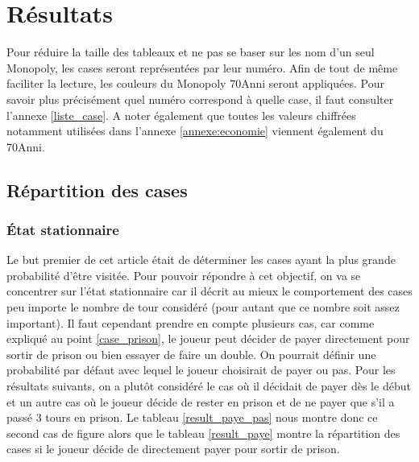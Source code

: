 \documentclass[letterpaper]{article}
\begin{document}
\section{Résultats}
  Pour réduire la taille des tableaux et ne pas se baser sur les nom d'un seul
  Monopoly, les cases seront représentées par leur numéro.  Afin de tout de même
  faciliter la lecture, les couleurs du Monopoly \monopoly70Anni
  seront appliquées.  Pour savoir plus précisément quel numéro
  correspond à quelle case, il faut consulter l'annexe \ref{liste_case}.  A noter
  également que toutes les valeurs chiffrées notamment utilisées dans l'annexe
  \ref{annexe:economie} viennent également du \monopoly70Anni.

  \subsection{Répartition des cases}

    \subsubsection{État stationnaire}
      Le but premier de cet article était de déterminer les cases ayant
      la plus grande probabilité d'être visitée.  Pour pouvoir répondre à
      cet objectif, on va se concentrer sur l'état stationnaire car il décrit
      au mieux le comportement des cases peu importe le nombre de tour considéré
      (pour autant que ce nombre soit assez important).  Il faut cependant
      prendre en compte plusieurs cas, car comme expliqué au point \ref{case_prison}, le
      joueur peut décider de payer directement pour sortir de prison ou bien
      essayer de faire un double.  On pourrait définir une probabilité par défaut
      avec lequel le joueur choisirait de payer ou pas.  Pour les résultats suivants,
      on a plutôt considéré le cas où il décidait de payer dès le début et un autre
      cas où le joueur décide de rester en prison et de ne payer que s'il a passé
      3 tours en prison.  Le tableau \ref{result_paye_pas} nous montre donc ce second
      cas de figure alors que le tableau \ref{result_paye} montre la répartition
      des cases si le joueur décide de directement payer pour sortir de prison.
\end{document}
